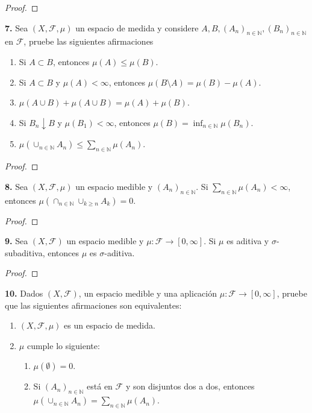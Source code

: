 \documentclass{article}
\newenvironment{statement}[1]{\smallskip\noindent\color[rgb]{1.00,0.00,0.50} {\bf #1.}}{}
\theoremstyle{definition}
\theoremstyle{remark}
\newcommand{\BN}{\mathbb N}
\begin{document}
\begin{proof}
\end{proof}

\begin{statement}{7}
  Sea $(X, \mathcal{F}, \mu)$ un espacio de medida y considere $A, B, (A_n)_{n \in \BN}, (B_n)_{n \in \BN}$ en $\mathcal{F}$, pruebe las siguientes afirmaciones
  \begin{enumerate}
    \item Si $A \subset B$, entonces $\mu(A) \leq \mu(B)$.
    \item Si $A \subset B$ y $\mu(A) < \infty$, entonces $\mu(B \setminus A) = \mu(B) - \mu(A)$.
    \item $\mu(A \cup B) + \mu(A \cup B) = \mu(A) + \mu(B)$.
    \item Si $B_n \downarrow B$ y $\mu(B_1) < \infty$, entonces $\mu(B) = \inf_{n \in \BN} \mu(B_n)$.
    \item $\mu(\cup_{n \in \BN} A_n) \leq \sum_{n \in \BN} \mu(A_n)$.
  \end{enumerate}
\end{statement}

\begin{proof}
\end{proof}

\begin{statement}{8}
  Sea $(X, \mathcal{F}, \mu)$ un espacio medible y $(A_n)_{n \in \BN}$. Si $\sum_{n \in \BN} \mu(A_n) < \infty$, entonces $\mu(\cap_{n \in \BN} \cup_{k \geq n} A_k) = 0$.
\end{statement}

\begin{proof}
\end{proof}

\begin{statement}{9}
  Sea $(X, \mathcal{F})$ un espacio medible y $\mu: \mathcal{F} \to [0, \infty]$. Si $\mu$ es aditiva y $\sigma$-subaditiva, entonces $\mu$ es $\sigma$-aditiva.
\end{statement}

\begin{proof}
\end{proof}

\begin{statement}{10}
  Dados $(X, \mathcal{F})$, un espacio medible y una aplicaci\'on $\mu: \mathcal{F} \to [0, \infty]$, pruebe que las siguientes afirmaciones son equivalentes:
  \begin{enumerate}
    \item $(X, \mathcal{F}, \mu)$ es un espacio de medida.
    \item $\mu$ cumple lo siguiente:
      \begin{enumerate}
        \item $\mu(\emptyset) = 0$.
        \item Si $(A_n)_{n \in \BN}$ est\'a en $\mathcal{F}$ y son disjuntos dos a dos, entonces $\mu(\cup_{n \in \BN} A_n) = \sum_{n \in \BN} \mu(A_n)$.
      \end{enumerate}
  \end{enumerate}
\end{statement}
\end{document}
